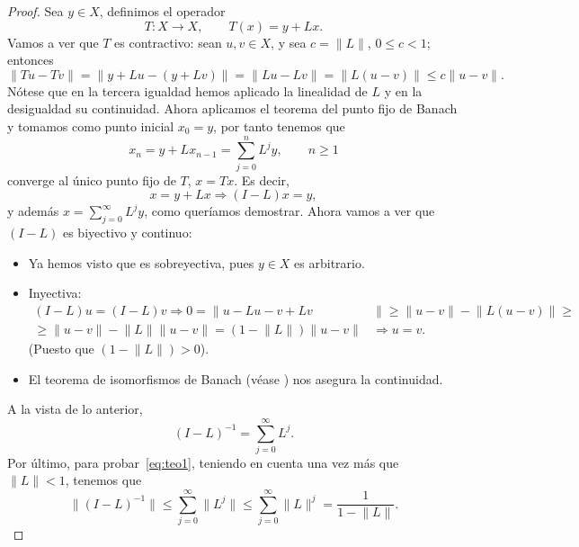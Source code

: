 \begin{proof}
	Sea $y \in X$, definimos el operador 
	\begin{equation}
		T: X \rightarrow X, \qquad T(x) = y+Lx.
	\end{equation}
	Vamos a ver que $T$ es contractivo: sean $u, v \in X$, y sea $c = \lVert L \rVert$, $0 \leqslant c < 1$; entonces 
	\begin{equation}
		\lVert Tu - Tv \rVert = \lVert y + Lu - (y + Lv) \rVert = \lVert Lu - Lv \rVert = \lVert L(u-v) \rVert \leqslant c\lVert u-v \rVert.
	\end{equation}
	Nótese que en la tercera igualdad hemos aplicado la linealidad de $L$ y en la desigualdad su continuidad. Ahora aplicamos el teorema del punto fijo de Banach y tomamos como punto inicial $x_0 = y$, por tanto tenemos que
	\begin{equation}
		x_n = y + Lx_{n-1} = \sum_{j=0}^{n}L^jy, \qquad n \geqslant 1
	\end{equation}
	converge al único punto fijo de $T$, $x = Tx$. Es decir,
	\begin{equation}
		x = y + Lx \Rightarrow (I-L)x=y,
	\end{equation}
	y además $x=\displaystyle\sum_{j=0}^{\infty}L^jy$, como queríamos demostrar. Ahora vamos a ver que $(I-L)$ es biyectivo y continuo:
	\begin{itemize}
		\item Ya hemos visto que es sobreyectiva, pues $y \in X$ es arbitrario.
		\item Inyectiva: 
		\begin{equation}
			\begin{split}
				(I-L)u = (I-L)v \Rightarrow 0 = \lVert u-Lu-v+Lv & \rVert \geqslant \lVert u-v \rVert - \lVert L(u-v) \rVert \geqslant \\
				  \geqslant \lVert u-v \rVert - \lVert L \rVert \lVert u-v \rVert = (1 - \lVert L \rVert) \lVert u-v  \rVert &\Rightarrow u = v.
			\end{split}
		\end{equation}
		(Puesto que $(1 - \lVert L \rVert) > 0$).
		\item El teorema de isomorfismos de Banach (véase \cite{brezis}) nos asegura la continuidad.
	\end{itemize}
	A la vista de lo anterior, 
	\begin{equation}
		(I-L)^{-1}=\sum_{j=0}^{\infty}L^j.
	\end{equation}
	Por último, para probar~\eqref{eq:teo1}, teniendo en cuenta una vez más que $\lVert L \rVert < 1$, tenemos que
	\begin{equation}
		\lVert (I-L)^{-1} \rVert \leqslant \sum_{j=0}^{\infty}\lVert L^j\rVert \leqslant \sum_{j=0}^{\infty}\lVert L\rVert^j = \dfrac{1}{1-\lVert L \rVert}.
	\end{equation}
\end{proof}
